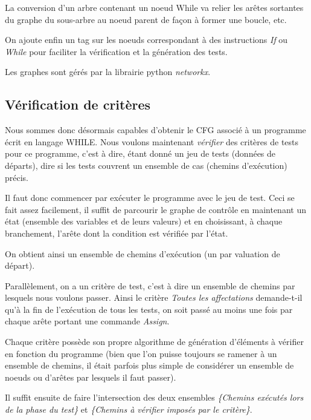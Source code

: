 La conversion d'un arbre contenant un noeud While va relier les arêtes sortantes du graphe du sous-arbre au noeud parent de façon à former une boucle, etc.

On ajoute enfin un tag sur les noeuds correspondant à des instructions \textit{If} ou \textit{While} pour faciliter la vérification et la génération des tests.

Les graphes sont gérés par la librairie python \textit{networkx}.

\subsection{Vérification de critères}

Nous sommes donc désormais capables d'obtenir le CFG associé à un programme écrit en langage WHILE. Nous voulons maintenant \textit{vérifier} des critères de tests pour ce programme, c'est à dire, étant donné un jeu de tests (données de départs), dire si les tests couvrent un ensemble de cas (chemins d'exécution) précis.

Il faut donc commencer par exécuter le programme avec le jeu de test. Ceci se fait assez facilement, il suffit de parcourir le graphe de contrôle en maintenant un état (ensemble des variables et de leurs valeurs) et en choisissant, à chaque branchement, l'arête dont la condition est vérifiée par l'état.

On obtient ainsi un ensemble de chemins d'exécution (un par valuation de départ).

Parallèlement, on a un critère de test, c'est à dire un ensemble de chemins par lesquels nous voulons passer. Ainsi le critère \textit{Toutes les affectations} demande-t-il qu'à la fin de l'exécution de tous les tests, on soit passé au moins une fois par chaque arête portant une commande \textit{Assign}.

Chaque critère possède son propre algorithme de génération d'éléments à vérifier en fonction du programme (bien que l'on puisse toujours se ramener à un ensemble de chemins, il était parfois plus simple de considérer un ensemble de noeuds ou d'arêtes par lesquels il faut passer).

Il suffit ensuite de faire l'intersection des deux ensembles \textit{\{Chemins exécutés lors de la phase du test\}} et \textit{\{Chemins à vérifier imposés par le critère\}}.



